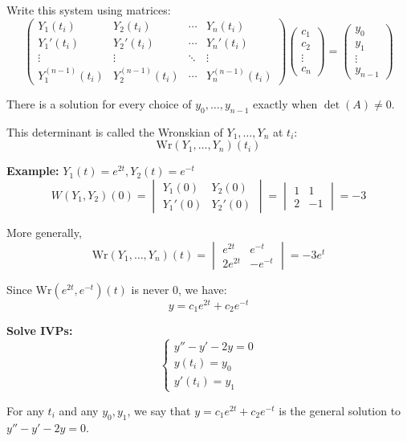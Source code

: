 \documentclass{article}
\begin{document}
Write this system using matrices:
\[
\begin{pmatrix}
Y_1(t_i) & Y_2(t_i) & \cdots & Y_n(t_i) \\
Y_1'(t_i) & Y_2'(t_i) & \cdots & Y_n'(t_i) \\
\vdots & \vdots & \ddots & \vdots \\
Y_1^{(n-1)}(t_i) & Y_2^{(n-1)}(t_i) & \cdots & Y_n^{(n-1)}(t_i)
\end{pmatrix}
\begin{pmatrix}
c_1 \\
c_2 \\
\vdots \\
c_n
\end{pmatrix}
=
\begin{pmatrix}
y_0 \\
y_1 \\
\vdots \\
y_{n-1}
\end{pmatrix}
\]

There is a solution for every choice of \( y_0, \ldots, y_{n-1} \) exactly when \( \det(A) \neq 0 \).

This determinant is called the Wronskian of \( Y_1, \ldots, Y_n \) at \( t_i \):
\[
\text{Wr}(Y_1, \ldots, Y_n)(t_i)
\]

\textbf{Example:} \( Y_1(t) = e^{2t}, Y_2(t) = e^{-t} \)
\[
W(Y_1, Y_2)(0) = \begin{vmatrix}
Y_1(0) & Y_2(0) \\
Y_1'(0) & Y_2'(0)
\end{vmatrix}
= \begin{vmatrix}
1 & 1 \\
2 & -1
\end{vmatrix}
= -3
\]

More generally,
\[
\text{Wr}(Y_1, \ldots, Y_n)(t) = \begin{vmatrix}
e^{2t} & e^{-t} \\
2e^{2t} & -e^{-t}
\end{vmatrix}
= -3e^{t}
\]

Since \( \text{Wr}(e^{2t}, e^{-t})(t) \) is never 0, we have:
\[
y = c_1 e^{2t} + c_2 e^{-t}
\]

\textbf{Solve IVPs:}
\[
\begin{cases}
y'' - y' - 2y = 0 \\
y(t_i) = y_0 \\
y'(t_i) = y_1
\end{cases}
\]

For any \( t_i \) and any \( y_0, y_1 \), we say that \( y = c_1 e^{2t} + c_2 e^{-t} \) is the general solution to \( y'' - y' - 2y = 0 \).
\end{document}
